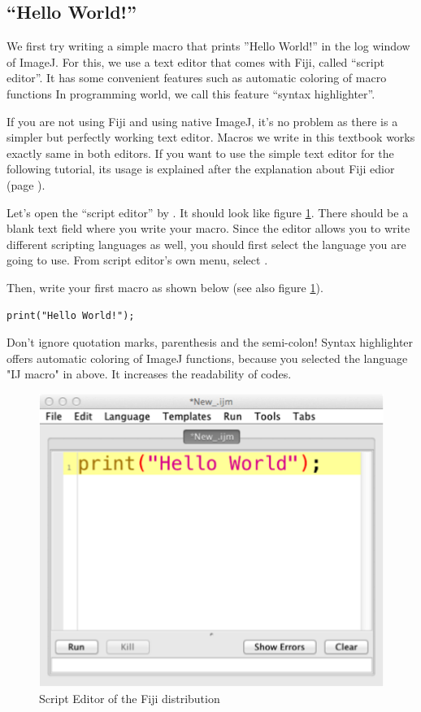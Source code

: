 \subsection{``Hello World!''}
We first try writing a simple macro that prints ''Hello World!'' in the log window of ImageJ. For this, we use a text editor that comes with Fiji, called ``script editor''. 
It has some convenient features such as automatic coloring of macro functions {In programming world, we call this feature ``syntax highlighter''}. 

If you are not using Fiji and using native ImageJ, it's no problem as there is a simpler but perfectly working text editor. Macros we write in this textbook works exactly same in both editors. If you want to use the simple text editor for the following tutorial, its usage is explained after the explanation about Fiji edior (page \pageref{part:nativeeditor}).   

Let's open the ``script editor'' 
by . It should look like figure \ref{fig_ScriptEditor}.
There should be a blank text field where you write your macro. Since the editor allows you to write different scripting languages as well, you should first select the language you are going to use.  
From script editor's own menu, select . 

Then, write your first macro as shown below (see also figure \ref{fig_ScriptEditor}). \\
\begin{lstlisting}[numbers=none]
print("Hello World!");
\end{lstlisting}

Don't ignore quotation marks, parenthesis and the semi-colon! 
Syntax highlighter offers automatic coloring of ImageJ functions, because you selected the language "IJ macro" in above. It increases the readability of codes. 

\begin{figure}[hbtp]
\begin{center}
\includegraphics[scale=1.0]{fig/editor_helloworld_singleline.png}
\caption{Script Editor of the Fiji distribution} \label{fig_ScriptEditor}
\end{center}
\end{figure}

